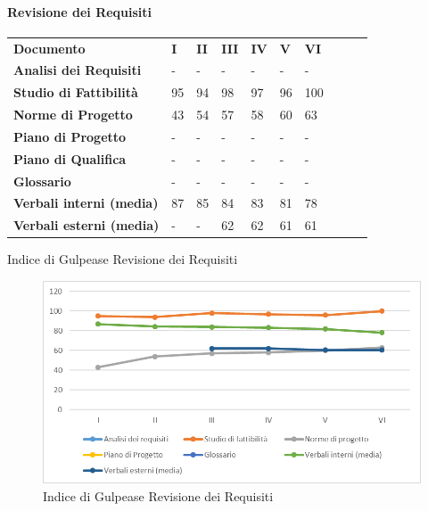 		\paragraph{Revisione dei Requisiti}
			\begin{longtable} {						
				>{}p{40mm}  		
				>{}p{8mm}		
				>{}p{8mm}		
				>{}p{8mm}		
				>{}p{8mm}		
				>{}p{8mm}		
				>{}p{8mm}
				>{}p{8mm}
				>{}p{8mm}
				>{}p{8mm}				
			}			
			\rowcolor{gray!50}
			\textbf{Documento} & \textbf{I} & \textbf{II} & \textbf{III} & \textbf{IV} & \textbf{V} & \textbf{VI} \TBstrut \\ [2mm]
			\textbf{Analisi dei Requisiti} & - & - & - & - & - & - \TBstrut \\ [2mm]
			\textbf{Studio di Fattibilità} & 95 & 94 & 98 & 97 & 96 & 100 \TBstrut \\ [2mm]
			\textbf{Norme di Progetto} & 43 & 54 & 57 & 58 & 60 & 63 \TBstrut \\ [2mm]
			\textbf{Piano di Progetto} & - & - & - & - & - & - \TBstrut \\ [2mm]
			\textbf{Piano di Qualifica} & - & - & - & - & - & - \TBstrut \\ [2mm]
			\textbf{Glossario} & - & - & - & - & - & - \TBstrut \\ [2mm]
			\textbf{Verbali interni (media)} & 87 & 85 & 84 & 83 & 81 & 78 \TBstrut \\ [2mm]
			\textbf{Verbali esterni (media)} & - & - & 62 & 62 & 61 & 61 \TBstrut \\ [2mm]
		\end{longtable}
	\caption{Indice di Gulpease Revisione dei Requisiti}
	\begin{figure}[H] 	
		\includegraphics[width=\linewidth]{./img/grafici/2.png}	
		\caption{Indice di Gulpease Revisione dei Requisiti}	
	\end{figure}
		
